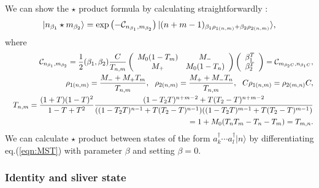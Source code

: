 \documentclass[12pt,a4paper]{article}
\begin{document}
We can show the $\star$ product formula by calculating straightforwardly :
\begin{equation}
\label{eqn:MST}
|n_{\beta_1}\star m_{\beta_2}\rangle=\exp\left(-{\cal C}_{n_{\beta_1},m_{\beta_2}}\right)|(n+m-1)_{\beta_1\rho_{1(n,m)}+\beta_2\rho_{2(n,m)}}\rangle,
\end{equation}
where
\begin{eqnarray}
\label{eqn:MSTP}
&&{\cal C}_{n_{\beta_1},m_{\beta_2}}={1\over2}(\beta_1,\beta_2){C\over T_{n,m}}
\left(
\begin{array}{cc}
M_0(1-T_m)  & M_-  \\
M_+     & M_0(1-T_n)
\end{array}
\right)
\left(
\begin{array}{c}
\beta_1^T     \\
\beta_2^T     
\end{array}
\right)={\cal C}_{m_{\beta_2C},n_{\beta_1C}},\nonumber \\
&&\rho_{1(n,m)}={M_-+M_+T_m\over T_{n,m}},\ \ \rho_{2(n,m)}={M_++M_-T_n\over T_{n,m}},\ \ C\rho_{1(n,m)}=\rho_{2(m,n)}C,\nonumber \\
&&T_{n,m}={(1+T)(1-T)^2\over1-T+T^2} {(1-T_2T)^{n+m-2}+T(T_2-T)^{n+m-2}\over((1-T_2T)^{n-1}+T(T_2-T)^{n-1})((1-T_2T)^{m-1}+T(T_2-T)^{m-1})}\nonumber \\
&&=1+M_0(T_n T_m -T_n -T_m)=T_{m,n}.
\end{eqnarray}
We can calculate $\star$ product between states of the form $a^\dagger_k\cdots a^\dagger_l|n\rangle$ by differentiating eq.(\ref{eqn:MST}) with parameter $\beta$ and setting $\beta=0$.

\subsubsection{Identity and sliver state}
\end{document}
